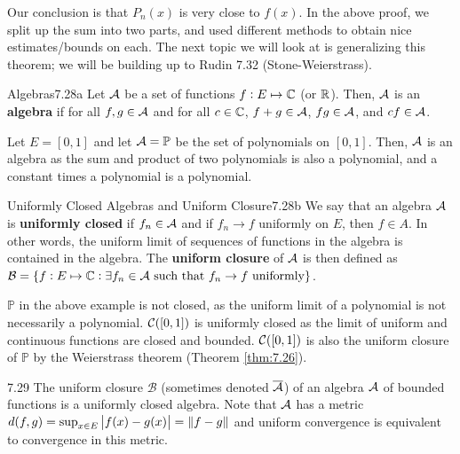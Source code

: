 \noindent Our conclusion is that $P_n(x)$ is very close to $f(x)$. In the above proof, we split up the sum into two parts, and used different methods to obtain nice estimates/bounds on each. The next topic we will look at is generalizing this theorem; we will be building up to Rudin 7.32 (Stone-Weierstrass).

\setcounter{rudin}{27}

\begin{definition}{Algebras}{7.28a}
    Let $\mathcal{A}$ be a set of functions $f: E \mapsto \mathbb{C}$ (or $\mathbb{R}$). Then, $\mathcal{A}$ is an \textbf{algebra} if for all $f, g \in \mathcal{A}$ and for all $c \in \mathbb{C}$, $f + g \in \mathcal{A}$, $fg \in \mathcal{A}$, and $cf \in \mathcal{A}$. 
\end{definition}

\begin{nexample}{}{}
    Let $E = [0, 1]$ and let $\mathcal{A} = \mathbb{P}$ be the set of polynomials on $[0, 1]$. Then, $\mathcal{A}$ is an algebra as the sum and product of two polynomials is also a polynomial, and a constant times a polynomial is a polynomial.
\end{nexample}

\setcounter{rudin}{27}

\begin{definition}{Uniformly Closed Algebras and Uniform Closure}{7.28b}
    We say that an algebra $\mathcal{A}$ is \textbf{uniformly closed} if $f_n \in \mathcal{A}$ and if $f_n \rightarrow f$ uniformly on $E$, then $f \in A$. In other words, the uniform limit of sequences of functions in the algebra is contained in the algebra. The \textbf{uniform closure} of $\mathcal{A}$ is then defined as $\mathcal{B} = \set{f: E \mapsto \mathbb{C}: \exists f_n \in \mathcal{A}\text{ such that } f_n \rightarrow f \text{ uniformly}}$. 
\end{definition}

\begin{nexample}{}{}
    $\mathbb{P}$ in the above example is not closed, as the uniform limit of a polynomial is not necessarily a polynomial. $\mathcal{C}([0, 1])$ is uniformly closed as the limit of uniform and continuous functions are closed and bounded. $\mathcal{C}([0, 1])$ is also the uniform closure of $\mathbb{P}$ by the Weierstrass theorem (Theorem \ref{thm:7.26}). 
\end{nexample}

\begin{theorem}{}{7.29}
    The uniform closure $\mathcal{B}$ (sometimes denoted $\overline{\mathcal{A}}$) of an algebra $\mathcal{A}$  of bounded functions is a uniformly closed algebra. Note that $\mathcal{A}$ has a metric $d(f, g) = \sup_{x \in E}\abs{f(x) - g(x)} = \norm{f - g}$ and uniform convergence is equivalent to convergence in this metric.
\end{theorem}

